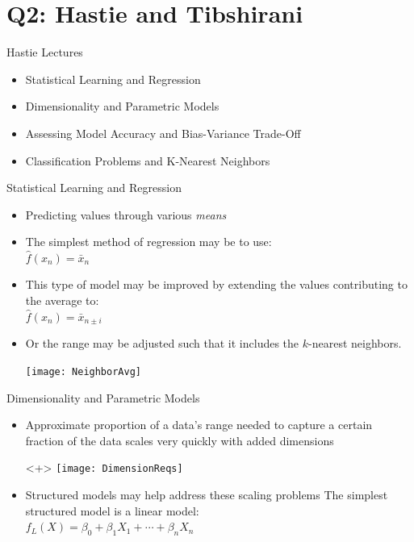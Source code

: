 \documentclass{beamer}
\begin{document}
\section[Q2]{Q2: Hastie and Tibshirani}

\begin{frame}{Hastie Lectures}
	\begin{itemize}
		\item Statistical Learning and Regression
		\item Dimensionality and Parametric Models
		\item Assessing Model Accuracy and Bias-Variance Trade-Off
		\item Classification Problems and K-Nearest Neighbors
	\end{itemize}
\end{frame}

\begin{frame}{Statistical Learning and Regression}
	\begin{itemize}[<+->]
		\item Predicting values through various \emph{means}
		\item The simplest method of regression may be to use: \\ 
			\vspace{0.5em} \hspace{4em} $ \hat{f}(x_n) = \bar{x}_n $
		\item This type of model may be improved by extending the values contributing to the average	to: \\ 
			\vspace{0.5em} \hspace{4em} $ \hat{f}(x_n) = \bar{x}_{n\pm i} $
		\item Or the range may be adjusted such that it includes the $k$-nearest neighbors.
		\item[] \hspace{4em} \texttt{[image: NeighborAvg]}
	\end{itemize}
\end{frame}

\begin{frame}{Dimensionality and Parametric Models}
	\begin{itemize}[<+->]
		\item Approximate proportion of a data's range needed to capture a certain fraction of the data scales very quickly with added dimensions
		\item[]<+> \hspace{4em} \texttt{[image: DimensionReqs]}
		\item Structured models may help address these scaling problems
		\subitem The simplest structured model is a linear model: \\
			\hspace{4em} $ f_L(X) = \beta_0 + \beta_1X_1 + \cdots + \beta_nX_n $
	\end{itemize}
\end{frame}
\end{document}
